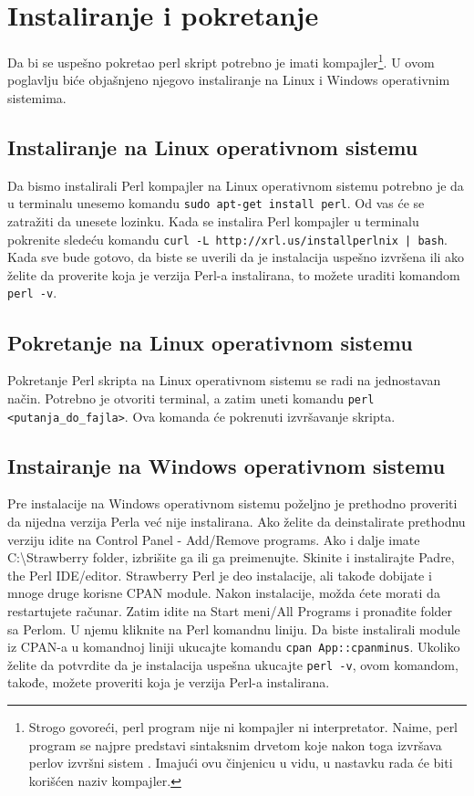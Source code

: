 \documentclass[a4paper]{article}
\begin{document}
\section{Instaliranje i pokretanje}
\label{sec:instalacija}

Da bi se uspešno pokretao perl skript potrebno je imati kompajler\footnote{Strogo govoreći, perl program nije ni kompajler ni interpretator. Naime, perl program se najpre predstavi sintaksnim drvetom koje nakon toga izvršava perlov izvršni sistem \cite{glosar}. Imajući ovu činjenicu u vidu, u nastavku rada će biti korišćen naziv kompajler.}. U ovom poglavlju biće objašnjeno njegovo instaliranje na Linux i Windows operativnim sistemima.

\subsection{Instaliranje na Linux operativnom sistemu}
Da bismo instalirali Perl kompajler na Linux operativnom sistemu potrebno je da u terminalu unesemo komandu {\lstinline!sudo apt-get install perl!}. Od vas će se zatražiti da unesete lozinku. Kada se instalira Perl kompajler u terminalu pokrenite sledeću komandu  {\lstinline !curl -L http://xrl.us/installperlnix | bash!}. Kada sve bude gotovo, da biste se uverili da je instalacija uspešno izvršena ili ako želite da proverite koja je verzija Perl-a instalirana, to možete uraditi komandom {\lstinline!perl -v!}.

\subsection{Pokretanje na Linux operativnom sistemu}
Pokretanje Perl skripta na Linux operativnom sistemu se radi na jednostavan način. Potrebno je otvoriti terminal, a zatim uneti komandu {\lstinline!perl <putanja_do_fajla>!}. Ova komanda će pokrenuti izvršavanje skripta.

\subsection{Instairanje na Windows operativnom sistemu}
Pre instalacije na Windows operativnom sistemu poželjno je  prethodno proveriti da nijedna verzija Perla već nije instalirana. Ako želite da deinstalirate prethodnu verziju idite na  Control Panel - Add/Remove programs. Ako i dalje imate C:\textbackslash Strawberry folder, izbrišite ga ili ga preimenujte. Skinite i instalirajte Padre, the Perl IDE/editor. Strawberry Perl je deo instalacije, ali takođe dobijate i mnoge druge korisne CPAN module. Nakon instalacije, možda ćete morati da restartujete računar. Zatim idite na Start meni/All Programs i pronađite folder sa Perlom. U njemu kliknite na Perl komandnu liniju.  Da biste instalirali module iz CPAN-a u komandnoj liniji ukucajte komandu {\lstinline!cpan App::cpanminus!}. Ukoliko želite da  potvrdite da je instalacija uspešna ukucajte {\lstinline!perl -v!}, ovom komandom, takođe, možete proveriti koja je verzija Perl-a instalirana.
\end{document}
